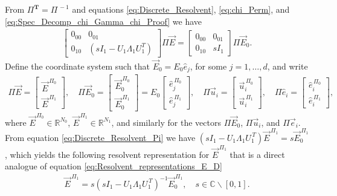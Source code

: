 \documentclass{cmslatex}
\newcommand{\T}{\mathbf{T}}
\begin{document}
From $\Pi^{\T}=\Pi^{\,-1}$ and equations \eqref{eq:Discrete_Resolvent},
\eqref{eq:chi_Perm}, and \eqref{eq:Spec_Decomp_chi_Gamma_chi_Proof} we
have 
%
\begin{align}\label{eq:Discrete_Resolvent_Pi}
  \left[
  \begin{array}{ccc}
    0_{00}&0_{01}\\
    0_{10}&(sI_1-U_1\Lambda_1U_1^T)
    \end{array}
\right]
\Pi\vec{E}
=
\left[
  \begin{array}{ccc}
    0_{00}&0_{01}\\
    0_{10}&sI_1
    \end{array}
\right]
\Pi\vec{E}_0.
\end{align}
%
Define the coordinate system such that $\vec{E}_0=E_0\hat{e}_j$, for
some $j=1,\ldots,d$, and write 
%
\begin{align}\label{Pi_coordinates_E}
  \Pi\vec{E}=
  \left[
  \begin{array}{ccc}
    \vec{E}^{\,\Pi_0}\\
    \vec{E}^{\,\Pi_1}
    \end{array}
\right],
\quad
 \Pi\vec{E}_0=
  \left[
  \begin{array}{ccc}
    \vec{E}_0^{\,\Pi_0}\\
    \vec{E}_0^{\,\Pi_1}
    \end{array}
\right]
=
E_0
\left[
  \begin{array}{ccc}
    \hat{e}_j^{\,\Pi_0}\\
    \hat{e}_j^{\,\Pi_1}
    \end{array}
\right],
\quad
 \Pi\vec{u}_i=
  \left[
  \begin{array}{ccc}
    \vec{u}_i^{\,\Pi_0}\\
    \vec{u}_i^{\,\Pi_1}
    \end{array}
\right],
\quad
\Pi\hat{e}_i=
  \left[
  \begin{array}{ccc}
    \hat{e}_i^{\,\Pi_0}\\
    \hat{e}_i^{\,\Pi_1}
    \end{array}
\right],
\end{align}
%
where $\vec{E}^{\,\Pi_0}\in\mathbb{R}^{N_0}$,
$\vec{E}^{\,\Pi_1}\in\mathbb{R}^{N_1}$, and similarly for the vectors
$\Pi\vec{E}_0$, $\Pi\vec{u}_i$, and $\Pi\vec{e}_i$. From equation
\eqref{eq:Discrete_Resolvent_Pi} we have
$(sI_1-U_1\Lambda_1U_1^{\,T})\vec{E}^{\,\Pi_1}=s\vec{E}_0^{\,\Pi_1}$, which
yields the following resolvent representation for $\vec{E}^{\,\Pi_1}$
that is a direct analogue of equation
\eqref{eq:Resolvent_representations_E_D} 
%
\begin{align}\label{eq:Resolvent_representations_E_Pi}
  \vec{E}^{\,\Pi_1}=s(sI_1-U_1\Lambda_1U_1^{\,T})^{-1}\vec{E}_0^{\,\Pi_1}, \quad
  s\in\mathbb{C}\backslash[0,1].
\end{align}
%
\end{document}

